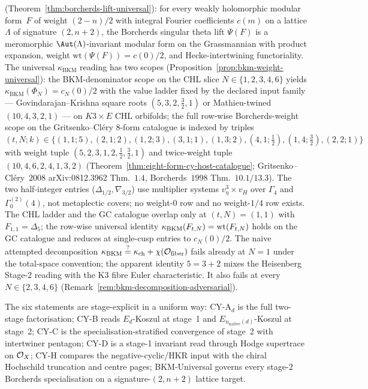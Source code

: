 \begin{enumerate}[label=\textup{(P\arabic*)},leftmargin=2em,
 topsep=0.3ex,itemsep=0.4ex]
 (Theorem~\ref{thm:borcherds-lift-universal}): for every
 weakly holomorphic modular form~$F$ of weight $(2-n)/2$
 with integral Fourier coefficients $c(m)$ on a lattice
 $\Lambda$ of signature $(2, n+2)$, the Borcherds singular
 theta lift $\Psi(F)$ is a meromorphic $\Aut(\Lambda)$-invariant
 modular form on the Grassmannian with product expansion,
 weight $\mathrm{wt}(\Psi(F)) = c(0)/2$, and Hecke-intertwining
 functoriality. The universal $\kappa_{\mathrm{BKM}}$ reading
 has two scopes
 (Proposition~\ref{prop:bkm-weight-universal}): the BKM-denominator
 scope on the CHL slice $N \in \{1, 2, 3, 4, 6\}$ yields
 $\kappa_{\mathrm{BKM}}(\Phi_N) = c_N(0)/2$ with the value ladder
 fixed by the declared input family --- Govindarajan--Krishna square
 roots $(5, 3, 2, \tfrac32, 1)$ or Mathieu-twined
 $(10, 4, 3, 2, 1)$ --- on $K3\times E$ CHL orbifolds; the
 full row-wise Borcherds-weight scope on the
 Gritsenko--Cl\'ery $8$-form catalogue is indexed by triples
 $(t, N; k) \in \{(1,1;5),(2,1;2),(1,2;3),(3,1;1),(1,3;2),
 (4,1;\tfrac12),(1,4;\tfrac32),(2,2;1)\}$ with weight tuple
 $(5, 2, 3, 1, 2, \tfrac12, \tfrac32, 1)$ and twice-weight tuple
 $(10, 4, 6, 2, 4, 1, 3, 2)$ (Theorem~\ref{thm:eight-form-cy-host-catalogue};
 Gritsenko--Cl\'ery~$2008$ arXiv:0812.3962 Thm.~$1.4$, Borcherds~$1998$
 Thm.~$10.1/13.3$). The two half-integer entries
 ($\Delta_{1/2}, \nabla_{3/2}$) use multiplier systems
 $v_\eta^3 \times v_H$ over $\Gamma_4$ and $\Gamma_0^{(2)}(4)$, not
 metaplectic covers; no weight-$0$ row and no weight-$1/4$ row
 exists. The CHL ladder and the GC catalogue overlap only at
 $(t, N) = (1, 1)$ with $F_{1, 1} = \Delta_5$; the row-wise universal
 identity $\kappa_{\mathrm{BKM}}(F_{t, N}) = \mathrm{wt}(F_{t, N})$ holds on the GC
 catalogue and reduces at single-cusp entries to $c_N(0)/2$. The naive
 attempted decomposition
 $\kappa_{\mathrm{BKM}} \stackrel{?}{=} \kappa_{\mathrm{ch}}
 + \chi(\mathcal{O}_{\mathrm{fiber}})$ fails already at $N=1$ under
 the total-space convention; the apparent identity $5=3+2$
 mixes the Heisenberg Stage-$2$ reading with the K3 fibre
 Euler characteristic. It also fails at every
 $N \in \{2,3,4,6\}$
 (Remark~\ref{rem:bkm-decomposition-adversarial}).
\end{enumerate}

The six statements are stage-explicit in a uniform way:
CY-A$_d$ is the full two-stage factorisation; CY-B reads
$E_d$-Koszul at stage~1 and $E_{n_{\mathrm{native}}(d)}$-Koszul
at stage~2; CY-C is the specialisation-stratified convergence
of stage~2 with intertwiner pentagon; CY-D is a stage-1 invariant
read through Hodge supertrace on $\mathcal{O}_X$; CY-H compares the
negative-cyclic/HKR input with the chiral Hochschild truncation and
centre pages; BKM-Universal governs
every stage-2 Borcherds specialisation on a signature-$(2, n+2)$
lattice target.

